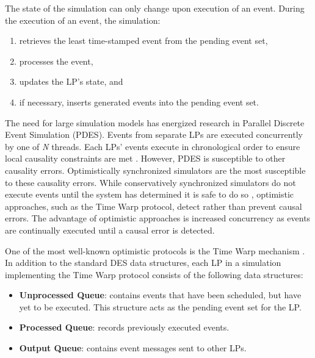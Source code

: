 \documentclass[11pt]{book}
\begin{document}
\noindent
The state of the simulation can only change upon execution of an event.  During the
execution of an event, the simulation: 

\vspace*{-\bigskipamount}
\begin{singlespace}
\begin{enumerate}
  \item retrieves the least time-stamped event from the pending event set,
  \item processes the event, 
  \item updates the LP's state, and 
  \item if necessary, inserts generated events into the pending event set.
\end{enumerate}
\end{singlespace}

The need for large simulation models has energized research in Parallel Discrete Event
Simulation (PDES).  Events from separate LPs are executed concurrently by one of \emph{N}
threads.  Each LPs' events execute in chronological order to ensure local causality
constraints are met \cite{fujimoto}.  However, PDES is susceptible to other causality
errors.  Optimistically synchronized simulators are the most susceptible to these
causality errors.  While conservatively synchronized simulators do not execute events
until the system has determined it is safe to do so \cite{fujimoto}, optimistic
approaches, such as the Time Warp protocol, detect rather than prevent causal errors. The
advantage of optimistic approaches is increased concurrency as events are continually
executed until a causal error is detected.

One of the most well-known optimistic protocols is the Time Warp mechanism
\cite{fujimoto}.  In addition to the standard DES data structures, each LP in a simulation
implementing the Time Warp protocol consists of the following data structures:

\vspace*{-\bigskipamount}
\begin{singlespace}
\begin{itemize}
  \item \textbf{Unprocessed Queue}: contains events that have been scheduled, but have yet
    to be executed.  This structure acts as the pending event set for the LP.
  \item\textbf{Processed Queue}: records previously executed events.
  \item\textbf{Output Queue}: contains event messages sent to other LPs.
\end{itemize}
\end{singlespace}
\end{document}
